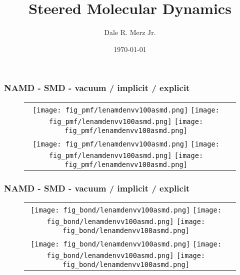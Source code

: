 \documentclass[9pt]{beamer} %
\title[]{Steered Molecular Dynamics}
\author{Dale R. Merz Jr.}
\institute[Ga Tech]
{ Georgia Institute of Technology \\
  \medskip {\emph{dmerz3@gatech.edu}} }
\date{\today}
\begin{document}
\begin{frame}
\frametitle{NAMD - SMD - vacuum / implicit / explicit}
{}
\begin{figure}
\begin{tabular}{cc}
\hspace*{-1cm}
\texttt{[image: fig\_pmf/lenamdenvv100asmd.png]}
\texttt{[image: fig\_pmf/lenamdenvv100asmd.png]}
\texttt{[image: fig\_pmf/lenamdenvv100asmd.png]} \\
\hspace*{-1cm}
\texttt{[image: fig\_pmf/lenamdenvv100asmd.png]}
\texttt{[image: fig\_pmf/lenamdenvv100asmd.png]}
\texttt{[image: fig\_pmf/lenamdenvv100asmd.png]} \\
\end{tabular}
\end{figure}
\end{frame}
\begin{frame}
\frametitle{NAMD - SMD - vacuum / implicit / explicit}
{}
\begin{figure}
\begin{tabular}{cc}
\hspace*{-1cm}
\texttt{[image: fig\_bond/lenamdenvv100asmd.png]}
\texttt{[image: fig\_bond/lenamdenvv100asmd.png]}
\texttt{[image: fig\_bond/lenamdenvv100asmd.png]} \\
\hspace*{-1cm}
\texttt{[image: fig\_bond/lenamdenvv100asmd.png]}
\texttt{[image: fig\_bond/lenamdenvv100asmd.png]}
\texttt{[image: fig\_bond/lenamdenvv100asmd.png]} \\
\end{tabular}
\end{figure}
\end{frame}
%
% 
\end{document}
